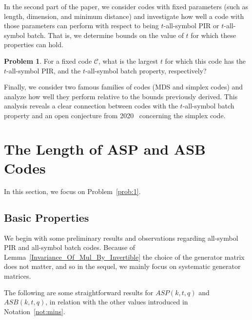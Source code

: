 \documentclass[11pt,a4paper]{article}
\theoremstyle{definition}
\newtheorem{problem}{Problem}
\newcommand{\mC}{\mathcal{C}}
\begin{document}
In the second part of the paper, we consider codes with fixed parameters (such as length, dimension, and minimum distance) and investigate how well a code with those parameters can perform with respect to being $t$-all-symbol PIR or $t$-all-symbol batch.  That is, we determine bounds on the value of $t$ for which these properties can hold.

\begin{problem} \label{prob:2}
    For a fixed code $\mC$, what is the largest $t$ for which this code has the $t$-all-symbol PIR, and the $t$-all-symbol batch property, respectively? 
\end{problem}

Finally, we consider two famous families of codes (MDS and simplex codes) and analyze how well they perform relative to the bounds previously derived. This analysis reveals a clear connection between codes with the $t$-all-symbol batch property and an open conjecture from 2020~\cite{YAAKOBI2020} concerning the simplex code.


\section{The Length of ASP and ASB Codes}\label{Sec:3_The_Length}

In this section, we focus on Problem~\ref{prob:1}. 

\subsection{Basic Properties}

We begin with some preliminary results and observations regarding all-symbol PIR and all-symbol batch codes. Because of Lemma~\ref{Invariance_Of_Mul_By_Invertible} the choice of the generator matrix does not matter, and so in the sequel, we mainly focus on systematic generator matrices.



The following are some straightforward results for $ASP(k,t,q)$ and $ASB(k,t,q)$, in relation with the other values introduced in Notation~\ref{not:mins}.
\end{document}
